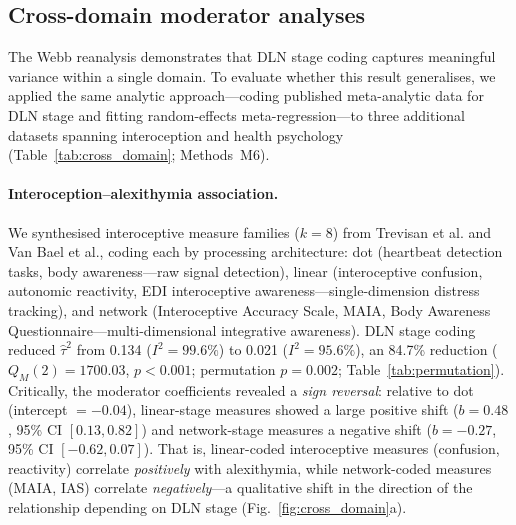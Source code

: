 \documentclass[11pt]{article}
\begin{document}
\subsection{Cross-domain moderator analyses}

The Webb reanalysis demonstrates that DLN stage coding captures
meaningful variance within a single domain. To evaluate whether this
result generalises, we applied the same analytic approach---coding
published meta-analytic data for DLN stage and fitting random-effects
meta-regression---to three additional datasets spanning
interoception and health psychology
(Table~\ref{tab:cross_domain}; Methods~M6).

\paragraph{Interoception--alexithymia association.}
We synthesised interoceptive measure families ($k = 8$) from Trevisan et
al.\cite{Trevisan2019} and Van Bael et al.\cite{VanBael2024}, coding
each by processing architecture: dot (heartbeat detection tasks, body
awareness---raw signal detection), linear (interoceptive confusion,
autonomic reactivity, EDI interoceptive awareness---single-dimension
distress tracking), and network (Interoceptive Accuracy Scale, MAIA,
Body Awareness Questionnaire---multi-dimensional integrative awareness).
DLN stage coding reduced $\hat\tau^2$ from 0.134 ($I^2 = 99.6\%$) to
0.021 ($I^2 = 95.6\%$), an 84.7\% reduction ($Q_M(2) = 1700.03$,
$p < 0.001$; permutation $p = 0.002$; Table~\ref{tab:permutation}). Critically, the moderator
coefficients revealed a \textit{sign reversal}: relative to dot
(intercept $= -0.04$), linear-stage measures showed a large positive
shift ($b = 0.48$, 95\% CI $[0.13, 0.82]$) and network-stage measures a
negative shift ($b = -0.27$, 95\% CI $[-0.62, 0.07]$). That is,
linear-coded interoceptive measures (confusion, reactivity) correlate
\textit{positively} with alexithymia, while network-coded measures
(MAIA, IAS) correlate \textit{negatively}---a qualitative shift in the
direction of the relationship depending on DLN stage
(Fig.~\ref{fig:cross_domain}a).
\end{document}
